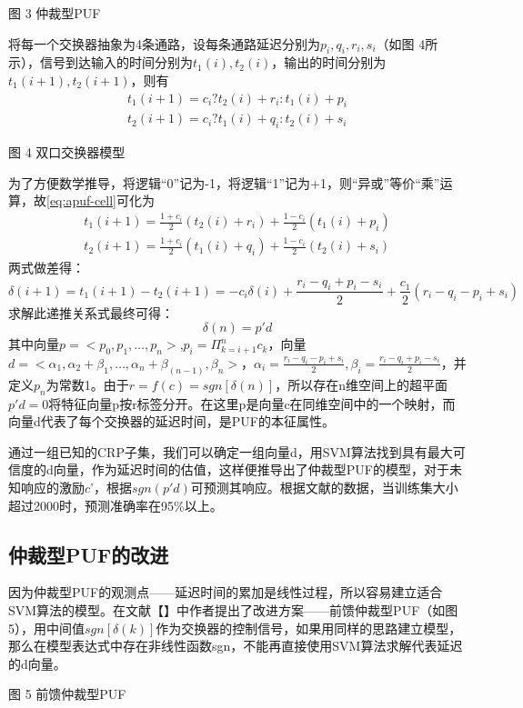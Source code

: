 图 3 仲裁型PUF

将每一个交换器抽象为4条通路，设每条通路延迟分别为$ p_i,q_i,r_i,s_i $（如图 4所示），信号到达输入的时间分别为$ t_1(i),t_2(i) $，输出的时间分别为$ t_1(i+1),t_2(i+1) $，则有
\begin{eqnarray}\label{eq:apuf-cell}
t_1(i+1)=c_i?t_2(i)+r_i:t_1(i)+p_i \\
t_2(i+1)=c_i?t_1(i)+q_i:t_2(i)+s_i
\end{eqnarray}

图 4 双口交换器模型

为了方便数学推导，将逻辑``0''记为-1，将逻辑``1''记为+1，则``异或''等价``乘''运算，故\ref{eq:apuf-cell}可化为
\begin{eqnarray}
t_1(i+1)=\frac{1+c_i}{2}(t_2(i)+r_i)+\frac{1-c_i}{2}(t_1(i)+p_i) \\
t_2(i+1)=\frac{1+c_i}{2}(t_1(i)+q_i)+\frac{1-c_i}{2}(t_2(i)+s_i)
\end{eqnarray}
两式做差得：
\begin{equation}
\delta (i+1)=t_1(i+1)-t_2(i+1)=-c_i\delta(i)+\frac{r_i-q_i+p_i-s_i}{2}+\frac{c_1}{2}(r_i-q_i-p_i+s_i)
\end{equation}
求解此递推关系式最终可得：
\begin{equation}
\delta(n)=p'd
\end{equation}
其中向量$ p=<p_0,p_1,…,p_n> $,$ p_i=\Pi_{k=i+1}^{n}c_k $，向量$ d=<\alpha_1,\alpha_2+\beta_1,…,\alpha_n+\beta_(n-1),\beta_n> $，$ \alpha_i=\frac{r_i-q_i-p_i+s_i}{2},\beta_i=\frac{r_i-q_i+p_i-s_i}{2} $，并定义$ p_n $为常数1。由于$ r=f(c)=sgn[\delta(n)] $，所以存在n维空间上的超平面$ p'd=0 $将特征向量p按r标签分开。在这里p是向量c在同维空间中的一个映射，而向量d代表了每个交换器的延迟时间，是PUF的本征属性。

通过一组已知的CRP子集，我们可以确定一组向量d，用SVM算法找到具有最大可信度的d向量，作为延迟时间的估值，这样便推导出了仲裁型PUF的模型，对于未知响应的激励$ c’ $，根据$ sgn(p'd) $可预测其响应。根据文献\supercite{chen2011bistable}的数据，当训练集大小超过2000时，预测准确率在95\%以上。
\subsection{仲裁型PUF的改进}
因为仲裁型PUF的观测点——延迟时间的累加是线性过程，所以容易建立适合SVM算法的模型。在文献【】中作者提出了改进方案——前馈仲裁型PUF（如图 5），用中间值$ sgn[\delta(k)] $作为交换器的控制信号，如果用同样的思路建立模型，那么在模型表达式中存在非线性函数sgn，不能再直接使用SVM算法求解代表延迟的d向量。
 
图 5 前馈仲裁型PUF


